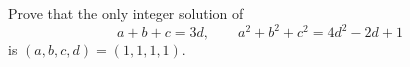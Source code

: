 Prove that the only integer solution of
\[
a+b+c=3d,\qquad a^2+b^2+c^2=4d^2-2d+1
\]
is $(a,b,c,d)=(1,1,1,1)$.
